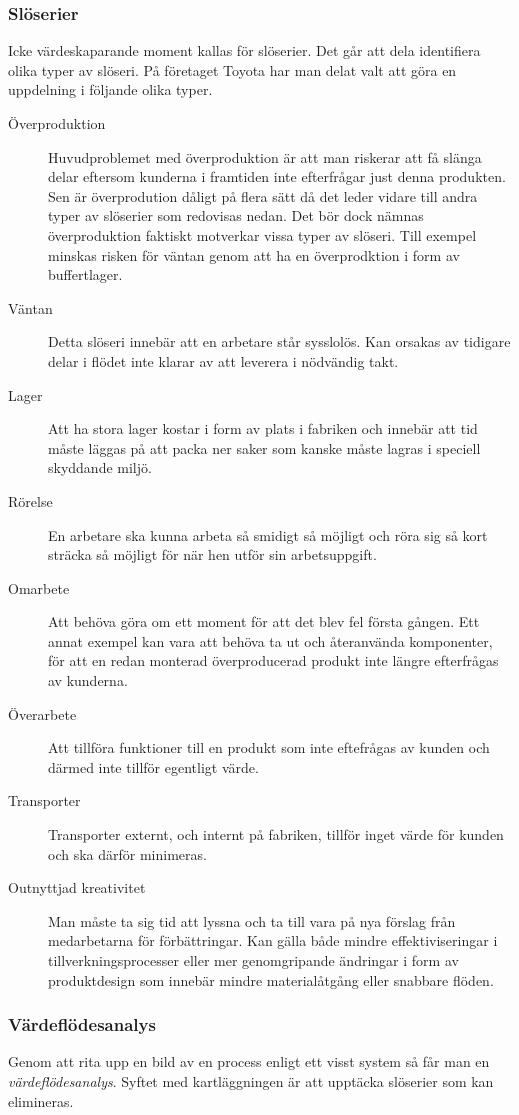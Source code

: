 \documentclass{article}
\begin{document}
\subsubsection*{Slöserier}
Icke värdeskaparande moment kallas för slöserier. Det går att dela identifiera olika typer av slöseri. På företaget Toyota har man delat valt att göra en uppdelning i följande olika typer. 
\begin{description}
\item[Överproduktion]
Huvudproblemet med överproduktion är att man riskerar att få slänga delar eftersom kunderna i framtiden inte efterfrågar just denna produkten. Sen är överprodution dåligt på flera sätt då det leder vidare till andra typer av slöserier som redovisas nedan. Det bör dock nämnas överproduktion faktiskt motverkar vissa typer av slöseri. Till exempel minskas risken för väntan genom att ha en överprodktion i form av buffertlager.
\item[Väntan]
Detta slöseri innebär att en arbetare står sysslolös. Kan orsakas av tidigare delar i flödet inte klarar av att leverera i nödvändig takt.
\item[Lager]
Att ha stora lager kostar i form av plats i fabriken och innebär att tid måste läggas på att packa ner saker som kanske måste lagras i speciell skyddande miljö. 
\item[Rörelse]
En arbetare ska kunna arbeta så smidigt så möjligt och röra sig så kort sträcka så möjligt för när hen utför sin arbetsuppgift.
\item[Omarbete]
Att behöva göra om ett moment för att det blev fel första gången. Ett annat exempel kan vara att behöva ta ut och återanvända komponenter, för att en redan monterad överproducerad produkt inte längre efterfrågas av kunderna.
\item[Överarbete]
Att tillföra funktioner till en produkt som inte eftefrågas av kunden och därmed inte tillför egentligt värde.
\item[Transporter]
Transporter externt, och internt på fabriken, tillför inget värde för kunden och ska därför minimeras.
\item[Outnyttjad kreativitet]
Man måste ta sig tid att lyssna och ta till vara på nya förslag från medarbetarna för förbättringar. Kan gälla både mindre effektiviseringar i tillverkningsprocesser eller mer genomgripande ändringar i form av produktdesign som innebär mindre materialåtgång eller snabbare flöden.  
\end{description}

\subsubsection*{Värdeflödesanalys}
Genom att rita upp en bild av en process enligt ett visst system så får man en \emph{värdeflödesanalys}. Syftet med kartläggningen är att upptäcka slöserier som kan elimineras.
\end{document}
